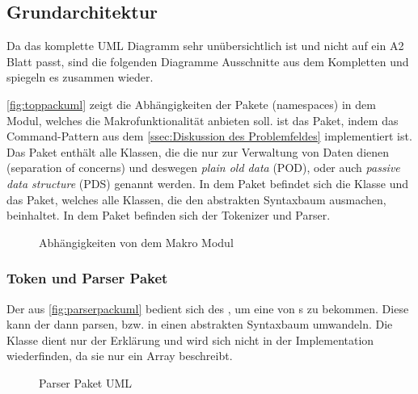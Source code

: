   \subsection{Grundarchitektur}
  \label{ssec:Grundarchitektur}
    Da das komplette UML Diagramm sehr unübersichtlich ist und nicht auf ein A2 Blatt passt, sind die folgenden Diagramme Ausschnitte aus dem Kompletten und spiegeln es zusammen wieder.

    \autoref{fig:toppackuml} zeigt die Abhängigkeiten der Pakete (namespaces) in dem Modul, welches die Makrofunktionalität anbieten soll.  ist das Paket, indem das Command-Pattern aus dem \autoref{ssec:Diskussion des Problemfeldes} implementiert ist. Das  Paket enthält alle Klassen, die die nur zur Verwaltung von Daten dienen (separation of concerns) und deswegen \emph{plain old data} (POD), oder auch \emph{passive data structure} (PDS) genannt werden. In dem  Paket befindet sich die  Klasse und das  Paket, welches alle Klassen, die den abstrakten Syntaxbaum ausmachen, beinhaltet. In dem  Paket befinden sich der Tokenizer und Parser.
    \begin{figure}[H]
      \centering
      \caption{Abhängigkeiten von dem Makro Modul}
      \label{fig:toppackuml}
    \end{figure}

    \subsubsection{Token und Parser Paket}
    \label{sssec:Token und Parser Paket}
      Der  aus \autoref{fig:parserpackuml} bedient sich des , um eine  von s zu bekommen. Diese  kann der  dann parsen, bzw. in einen abstrakten Syntaxbaum umwandeln. Die  Klasse dient nur der Erklärung und wird sich nicht in der Implementation wiederfinden, da sie nur ein Array beschreibt.
      \begin{figure}[H]
        \centering
        \caption{Parser Paket UML}
        \label{fig:parserpackuml}
      \end{figure}

